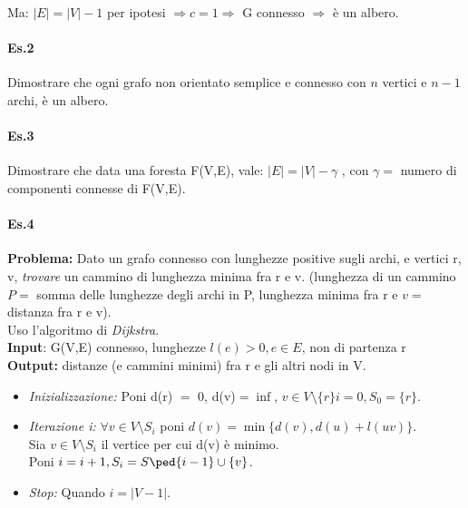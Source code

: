 \noindent
Ma: \(|E| = |V| -1\) per ipotesi $\Rightarrow c=1 \Rightarrow$ G connesso $\Rightarrow$ è un albero.

\paragraph{Es.2}
Dimostrare che ogni grafo non orientato semplice e connesso con $n$ vertici e $n-1$ archi, è un albero.

\paragraph{Es.3}
Dimostrare che data una foresta F(V,E), vale: \(|E | = |V| - \gamma \) , con $\gamma =$ numero di componenti connesse di F(V,E).

\paragraph{Es.4}
\textbf{Problema:} Dato un grafo connesso con lunghezze positive sugli archi, e vertici r, v,
\emph{trovare} un cammino di lunghezza minima fra r e v. (lunghezza di un cammino $P =$ somma delle
lunghezze degli archi in P, lunghezza minima fra r e $v=$ distanza fra r e v). \\
Uso l'algoritmo di \emph{Dijkstra}. \\

\noindent
\textbf{Input}: G(V,E) connesso, lunghezze \(l(e) > 0, e \in E\), non di partenza r \\
\textbf{Output:} distanze (e cammini minimi) fra r e gli altri nodi in V.
\begin{itemize}
    \item \emph{Inizializzazione:} Poni d(r) $=$ 0, d(v)$= \inf$, \(v \in V \setminus \{r \} i= 0, S_0 = \{r \}\). 
    \item \emph{Iterazione i:} \(\forall v \in V \setminus S_i\) poni \(d(v)= \min \{ d(v), d(u)+l(uv) \}\). \\
Sia $v \in V \setminus S_i$ il vertice per cui d(v) è minimo. \\
Poni \(i=i +1, S_i=S\ped{i-1} \cup \{ v\}\). 
    \item \emph{Stop:} Quando $i= |V-1|$.
\end{itemize}


\newpage
